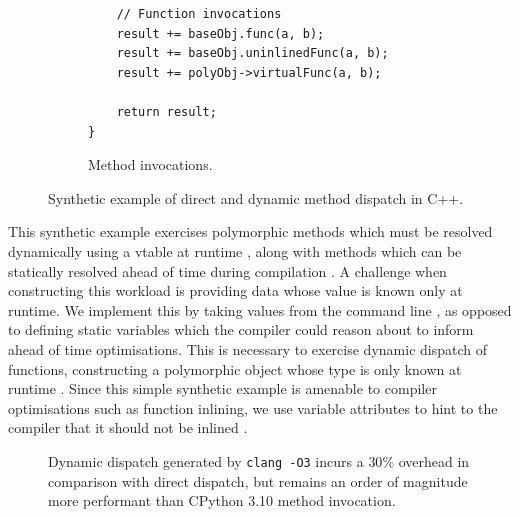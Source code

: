 \begin{figure}[H]
\begin{subfigure}[b]{0.45\textwidth}
\begin{verbatim}
    // Function invocations
    result += baseObj.func(a, b);
    result += baseObj.uninlinedFunc(a, b);
    result += polyObj->virtualFunc(a, b);

    return result;
}
        \end{verbatim}
        \captionsetup{name=Listing}
        \caption{Method invocations.}
        \label{listing:impact-dispatch-invocation}
    \end{subfigure}
    \vspace{1em}
    \captionsetup{name=Listing}
    \caption{Synthetic example of direct and dynamic method dispatch in C++.}
    \label{listing:impact-dispatch}
\end{figure}

This synthetic example exercises polymorphic methods which must be resolved dynamically using a \ac{vtable} at runtime , along with methods which can be statically resolved ahead of time during compilation .
A challenge when constructing this workload is providing data whose value is known only at runtime. We implement this by taking values from the command line , as opposed to defining static variables which the compiler could reason about to inform ahead of time optimisations. This is necessary to exercise dynamic dispatch of functions, constructing a polymorphic object whose type is only known at runtime . Since this simple synthetic example is amenable to compiler optimisations such as function inlining, we use variable attributes to hint to the compiler that it should not be inlined .

\begin{figure}[H]
    \centering
    \caption{Dynamic dispatch generated by \texttt{clang -O3} incurs a $30\%$ overhead in comparison with direct dispatch, but remains an order of magnitude more performant than CPython 3.10 method invocation.}
    \label{figure:impact-dispatch}
\end{figure}


